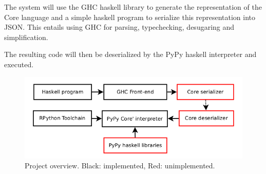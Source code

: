 The system will use the GHC haskell library to generate the 
representation of the Core language and a simple haskell program to 
serialize this representation into JSON. This entails using GHC for
parsing, typechecking, desugaring and simplification.

The resulting code will then be deserialized by the PyPy haskell interpreter 
and executed. 

\begin{figure}
\includegraphics[width=\textwidth]{diags/overview.png}
\caption{Project overview. Black: implemented, Red: unimplemented.}
\end{figure}


